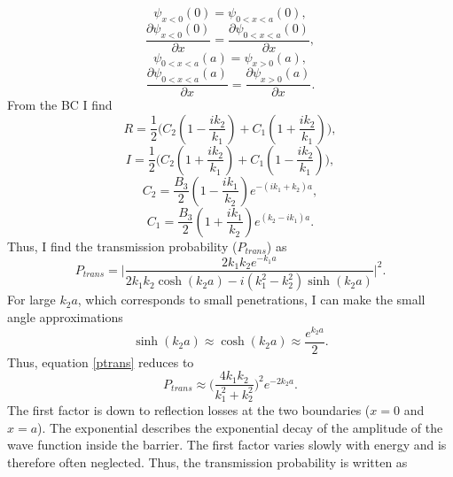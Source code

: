 \begin{example}
	\begin{equation}
		\psi_{x<0}(0)=\psi_{0<x<a}(0),
	\end{equation} 
	\begin{equation}
		\frac{\partial \psi_{x<0}(0)}{\partial x}=\frac{\partial \psi_{0<x<a}(0)}{\partial x},
	\end{equation} 
	\begin{equation}
		\psi_{0<x<a}(a)=\psi_{x>0}(a),
	\end{equation} 
	\begin{equation}
		\frac{\partial \psi_{0<x<a}(a)}{\partial x}=\frac{\partial \psi_{x>0}(a)}{\partial x}.
	\end{equation} 
	From the BC I find
	\begin{equation}
		R=\frac{1}{2}\bigg(C_2(1-\frac{ik_2}{k_1})+C_1(1+\frac{ik_2}{k_1})\bigg),
	\end{equation} 
	\begin{equation}
		I=\frac{1}{2}\bigg(C_2(1+\frac{ik_2}{k_1})+C_1(1-\frac{ik_2}{k_1})\bigg),
	\end{equation} 
	\begin{equation}
		C_2=\frac{B_3}{2}(1-\frac{ik_1}{k_2})e^{-(ik_1+k_2)a},
	\end{equation} 
	\begin{equation}
		C_1=\frac{B_3}{2}(1+\frac{ik_1}{k_2})e^{(k_2-ik_1)a}.
	\end{equation} 
	Thus, I find the transmission probability ($P_{trans}$) as~\citep[p.340]{BR}
	\begin{equation}
		P_{trans}=\bigg|\frac{2k_1k_2e^{-k_1a}}{2k_1k_2\cosh(k_2a)-i(k_1^2-k_2^2)\sinh(k_2a)}\bigg|^2.
		\label{ptrans}
	\end{equation} 
	For large $k_2a$, which corresponds to small penetrations, I can make the small angle approximations
	\begin{equation}
		\sinh(k_2a)\approx
		\cosh(k_2a)\approx\frac{e^{k_2a}}{2}.
	\end{equation} 
	Thus, equation \eqref{ptrans} reduces to
	\begin{equation}
		P_{trans}\approx\bigg(\frac{4k_1k_2}{k_1^2+k_2^2}\bigg)^2e^{-2k_2a}.
		\label{ptrans2}
	\end{equation} 
	The first factor is down to reflection losses at the two boundaries ($x=0$ and $x=a$). The exponential describes the exponential decay of the amplitude of the wave function inside the barrier. The first factor varies slowly with energy and is therefore often neglected. Thus, the transmission probability is written as

\end{example}
